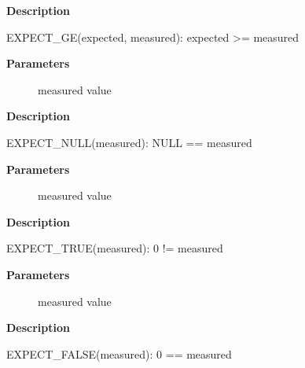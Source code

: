 \documentclass[a4paper,8pt,english]{sphinxmanual}
\begin{document}
\textbf{Description}

EXPECT\_GE(expected, measured): expected \textgreater{}= measured

\begin{fulllineitems}
\label{dev-tools/kselftest:c.EXPECT_NULL}
\end{fulllineitems}


\textbf{Parameters}
\begin{description}
\item[{}] \leavevmode
measured value

\end{description}

\textbf{Description}

EXPECT\_NULL(measured): NULL == measured

\begin{fulllineitems}
\label{dev-tools/kselftest:c.EXPECT_TRUE}
\end{fulllineitems}


\textbf{Parameters}
\begin{description}
\item[{}] \leavevmode
measured value

\end{description}

\textbf{Description}

EXPECT\_TRUE(measured): 0 != measured

\begin{fulllineitems}
\label{dev-tools/kselftest:c.EXPECT_FALSE}
\end{fulllineitems}


\textbf{Parameters}
\begin{description}
\item[{}] \leavevmode
measured value

\end{description}

\textbf{Description}

EXPECT\_FALSE(measured): 0 == measured

\begin{fulllineitems}
\label{dev-tools/kselftest:c.EXPECT_STREQ}
\end{fulllineitems}
\end{document}
